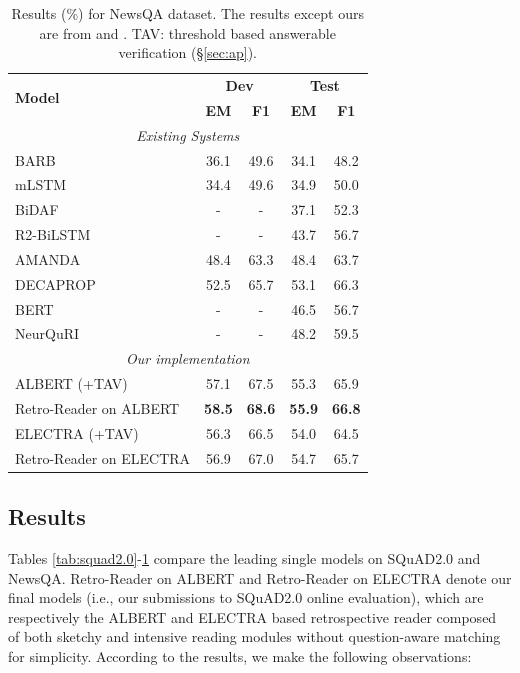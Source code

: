 \documentclass[letterpaper]{article} %
\begin{document}
\begin{table}
\centering
\setlength{\tabcolsep}{4.2pt}
{
\begin{tabular}{l c c c c }
\toprule
\multirow{2}{*}{\textbf{Model} }& \multicolumn{2}{c}{\textbf{Dev}} & \multicolumn{2}{c}{\textbf{Test}}\\
& \textbf{EM} & \textbf{F1}&   \textbf{EM} & \textbf{F1}\\
\midrule
\multicolumn{5}{c}{\emph{Existing Systems}} \\
BARB \cite{trischler2017newsqa} &36.1  & 49.6 & 34.1 & 48.2  \\
mLSTM \cite{DBLP:conf/iclr/Wang017a} & 34.4 & 49.6 & 34.9 & 50.0 \\
BiDAF \cite{Seo2016Bidirectional} & - & - & 37.1 & 52.3  \\
R2-BiLSTM \cite{DBLP:journals/corr/Weissenborn17} & - & - & 43.7 & 56.7  \\
AMANDA \cite{DBLP:conf/aaai/KunduN18} & 48.4& 63.3 &48.4 &63.7  \\
DECAPROP \cite{tay2018densely} & 52.5 &65.7 &53.1 &66.3 \\
BERT \cite{devlin2018bert} & - & - & 46.5 & 56.7 \\
NeurQuRI \cite{back2020neurquri} & - & - & 48.2 & 59.5 \\
\midrule
\multicolumn{5}{c}{\emph{Our implementation}} \\
ALBERT (+TAV) & 57.1 & 67.5 & 55.3 & 65.9\\
Retro-Reader on ALBERT  &  \textbf{58.5} & \textbf{68.6} & \textbf{55.9} &  \textbf{66.8} \\
ELECTRA (+TAV)  & 56.3 & 66.5 & 54.0 & 64.5\\
Retro-Reader on ELECTRA & 56.9 &  67.0 & 54.7& 65.7 \\
\bottomrule
\end{tabular}
}
\caption{Results (\%) for NewsQA dataset. The results except ours are from \citeauthor{tay2018densely}  and \citeauthor{back2020neurquri} . TAV: threshold based answerable verification (\S\ref{sec:ap}).}\label{tab:newsqa}
\end{table}



\subsection{Results}
Tables \ref{tab:squad2.0}-\ref{tab:newsqa} compare the leading single models on SQuAD2.0 and NewsQA.
Retro-Reader on ALBERT and Retro-Reader on ELECTRA denote our final models (i.e., our submissions to SQuAD2.0 online evaluation), which are respectively the ALBERT and ELECTRA based retrospective reader composed of both sketchy and intensive reading modules without question-aware matching for simplicity. %
According to the results, we make the following observations:
\end{document}
